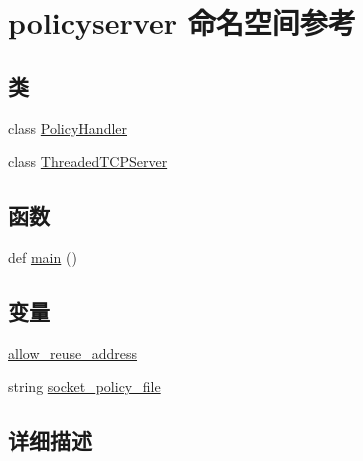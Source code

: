 \hypertarget{namespacepolicyserver}{}\section{policyserver 命名空间参考}
\label{namespacepolicyserver}
\subsection*{类}
\begin{DoxyCompactItemize}
\item 
class \mbox{\hyperlink{classpolicyserver_1_1_policy_handler}{Policy\+Handler}}
\item 
class \mbox{\hyperlink{classpolicyserver_1_1_threaded_t_c_p_server}{Threaded\+T\+C\+P\+Server}}
\end{DoxyCompactItemize}
\subsection*{函数}
\begin{DoxyCompactItemize}
\item 
def \mbox{\hyperlink{namespacepolicyserver_ab37343f5b6097b691f5efd9ae45036e3}{main}} ()
\end{DoxyCompactItemize}
\subsection*{变量}
\begin{DoxyCompactItemize}
\item 
\mbox{\hyperlink{namespacepolicyserver_aa784b6304155ce0934d42d59eee3578f}{allow\+\_\+reuse\+\_\+address}}
\item 
string \mbox{\hyperlink{namespacepolicyserver_a6a9b70cac80cf2d7fe69f6effc595f13}{socket\+\_\+policy\+\_\+file}}
\end{DoxyCompactItemize}


\subsection{详细描述}
 


